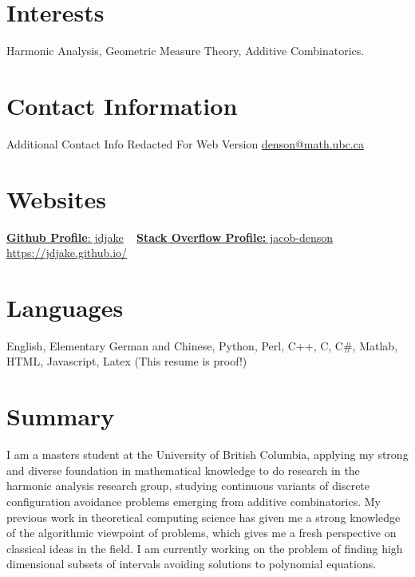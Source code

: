 \documentclass{friggeri-cv} %
\begin{document}


\begin{aside} %
\section{Interests}
Harmonic Analysis, Geometric Measure Theory, Additive Combinatorics.
\section{Contact Information}
Additional Contact Info Redacted For Web Version
\href{mailto:denson@math.ubc.ca}{denson@math.ubc.ca}
\section{Websites}
\href{https://github.com/jdjake}{{\bf Github Profile}: jdjake}
~
\href{http://stackoverflow.com/users/2601483/jacob-denson}{{\bf Stack Overflow Profile:} jacob-denson}
~
\href{https://jdjake.github.io/}{https://jdjake.github.io/}
\section{Languages}
English, Elementary German and Chinese,
Python, Perl, C++, C, C\#, Matlab, HTML, Javascript, Latex (This resume is proof!)
\end{aside}


\section{Summary}

I am a masters student at the University of British Columbia, applying my strong and diverse foundation in mathematical knowledge to do research in the harmonic analysis research group, studying continuous variants of discrete configuration avoidance problems emerging from additive combinatorics. My previous work in theoretical computing science has given me a strong knowledge of the algorithmic viewpoint of problems, which gives me a fresh perspective on classical ideas in the field. I am currently working on the problem of finding high dimensional subsets of intervals avoiding solutions to polynomial equations.
\end{document}
